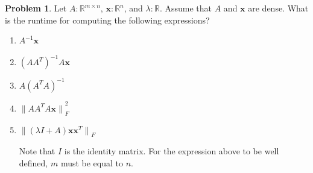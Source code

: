 \documentclass[10pt]{article}
\theoremstyle{definition}
\newtheorem{problem}{Problem}
\newcommand{\R}{\mathbb R}
\newcommand{\trans}[1]{{#1}^{T}}
\newcommand{\x}{\mathbf x}
\newcommand{\ltwo}[1]{{\lVert {#1} \rVert}_2}
\newcommand{\lp}[1]{{\lVert {#1} \rVert}_p}
\newcommand{\lF}[1]{{\lVert {#1} \rVert}_F}
\begin{document}
%
%
\begin{problem}
    Let $A : \R^{m \times n}$, $\x : \R^n$, and $\lambda : \R$.
    Assume that $A$ and $\x$ are dense.
    What is the runtime for computing the following expressions?
    \begin{enumerate}
        \item $A^{-1}\x$
            \vspace{4in}
            \newpage
        \item $(A \trans A)^{-1} A \x$
            \vspace{4in}
            \newpage
        \item $A (\trans A A)^{-1}$
            \vspace{4in}
            \newpage
        \item $\lF{A \trans A A \x}^2$
            \vspace{4in}
            \newpage
        \item $\lF{(\lambda I + A) \x \trans \x}$

            Note that $I$ is the identity matrix.
            For the expression above to be well defined, $m$ must be equal to $n$.
            \vspace{4in}
    \end{enumerate}
\end{problem}
\end{document}
